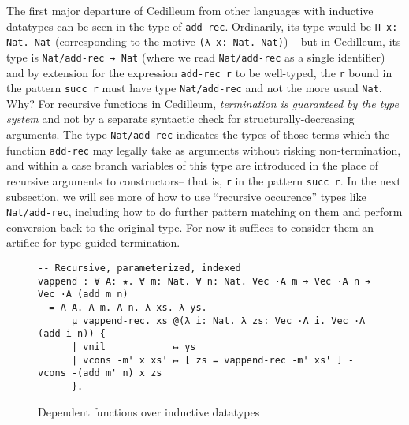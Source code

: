 \documentclass{article}
\newcommand{\vars}[1]{{\overline{#1}}}
\begin{document}
The first major departure of Cedilleum from other languages with inductive
datatypes can be seen in the type of \texttt{add-rec}. Ordinarily, its type
would be \verb;Π x: Nat. Nat; (corresponding to the motive
\verb;(λ x: Nat. Nat);) -- but in Cedilleum, its type is
\verb;Nat/add-rec ➔ Nat; (where we read \texttt{Nat/add-rec} as a single
identifier) and by extension for the expression \texttt{add-rec r} to be
well-typed, the \texttt{r} bound in the pattern \texttt{succ r} must have type
\texttt{Nat/add-rec} and not the more usual \texttt{Nat}. Why? For recursive
functions in Cedilleum, \textit{termination is guaranteed by the type system}
and not by a separate syntactic check for structurally-decreasing arguments. The
type \texttt{Nat/add-rec} indicates the types of those terms which the function
\texttt{add-rec} may legally take as arguments without risking non-termination,
and within a case branch variables of this type are introduced in the place of
recursive arguments to constructors\footnotemark -- that is, \texttt{r} in the
pattern \texttt{succ r}. In the next subsection, we will see more of how to use
``recursive occurence'' types like \texttt{Nat/add-rec}, including how to do
further pattern matching on them and perform conversion back to the original
type. For now it suffices to consider them an artifice for type-guided
termination.


\begin{figure}[h]
\begin{verbatim}
-- Recursive, parameterized, indexed
vappend : ∀ A: ★. ∀ m: Nat. ∀ n: Nat. Vec ·A m ➔ Vec ·A n ➔ Vec ·A (add m n)
  = Λ A. Λ m. Λ n. λ xs. λ ys.
      μ vappend-rec. xs @(λ i: Nat. λ zs: Vec ·A i. Vec ·A (add i n)) {
      | vnil            ↦ ys
      | vcons -m' x xs' ↦ [ zs = vappend-rec -m' xs' ] - vcons -(add m' n) x zs
      }.
\end{verbatim}
  \caption{Dependent functions over inductive datatypes}
  \label{fig:ex-data-dep}
\end{figure}
\end{document}
